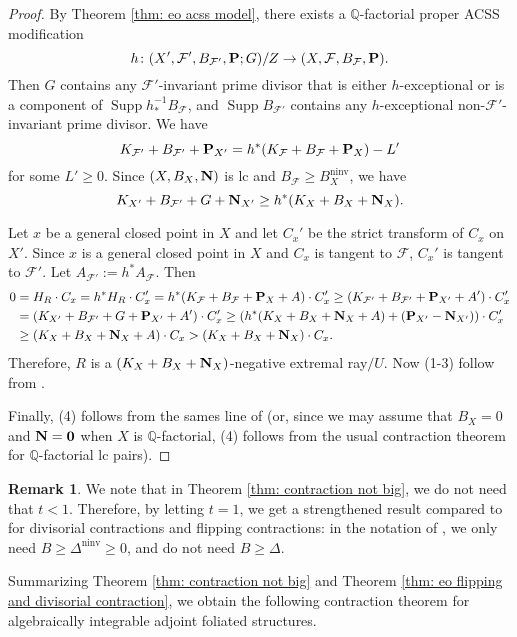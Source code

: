 \documentclass[12pt]{amsart}
\numberwithin{equation}{section}
\newcommand{\Nn}{{\bf{N}}}
\newcommand{\Pp}{{\bf{P}}}
\newcommand{\Qq}{\mathbb{Q}}
\newcommand{\ninv}{\operatorname{ninv}}
\newcommand{\Supp}{\operatorname{Supp}}
\newcommand{\Ff}{\mathcal{F}}
\theoremstyle{definition}
\theoremstyle{definition}
\newtheorem{rem}[thm]{Remark}
\theoremstyle{definition}
\begin{document}
\begin{proof}
By Theorem \ref{thm: eo acss model}, there exists a $\Qq$-factorial proper  ACSS modification $$h\colon (X',\Ff',B_{\Ff'},\Pp;G)/Z\rightarrow (X,\Ff,B_{\Ff},\Pp).$$ Then $G$ contains any $\Ff'$-invariant prime divisor that is either $h$-exceptional or is a component of $\Supp h_\ast ^{-1}B_{\Ff}$, and $\Supp B_{\Ff'}$ contains any $h$-exceptional non-$\Ff'$-invariant prime divisor. We have
$$K_{\Ff'}+B_{\Ff'}+\Pp_{X'}=h^\ast (K_{\Ff}+B_{\Ff}+\Pp_X)-L'$$
for some $L'\geq 0$. Since $(X,B_X,\Nn)$ is lc and $B_{\Ff}\geq B_X^{\ninv}$, we have
$$K_{X'}+B_{\Ff'}+G+\Nn_{X'}\geq h^\ast (K_X+B_X+\Nn_X).$$

Let $x$ be a general closed point in $X$ and let $C_x'$ be the strict transform of $C_x$ on $X'$.  Since $x$ is a general closed point in $X$ and $C_x$ is tangent to $\Ff$, $C_x'$ is tangent to $\Ff'$.  Let $A_{\Ff'}:=h^\ast A_{\Ff}$. Then
\begin{align*}
  0&=H_R\cdot C_x=h^\ast H_R\cdot C_x'=h^\ast (K_{\Ff}+B_{\Ff}+\Pp_X+A)\cdot C_x'\geq (K_{\Ff'}+B_{\Ff'}+\Pp_{X'}+A')\cdot C_x'\\
  &=(K_{X'}+B_{\Ff'}+G+\Pp_{X'}+A')\cdot C_x'\geq (h^\ast (K_X+B_X+\Nn_X+A)+(\Pp_{X'}-\Nn_{X'}))\cdot C_x'\\
  &\geq (K_X+B_X+\Nn_X+A)\cdot C_x>(K_X+B_X+\Nn_X)\cdot C_x.
\end{align*}
Therefore, $R$ is a $(K_X+B_X+\Nn_X)$-negative extremal ray$/U$. Now (1-3) follow from \cite[Theorems 2.2.1(4), 2.2.6]{CHLX23}. 

Finally, (4) follows from the sames line of \cite[Proof of Corollary 3.18]{KM98} (or, since we may assume that $B_X=0$ and $\Nn=\bm{0}$ when $X$ is $\Qq$-factorial, (4) follows from the usual contraction theorem for $\Qq$-factorial lc pairs).
\end{proof}

\begin{rem}
    We note that in Theorem \ref{thm: contraction not big}, we do not need that $t<1$. Therefore, by letting $t=1$, we get a strengthened result compared to \cite[Proposition 7.1]{LMX24b} for divisorial contractions and flipping contractions: in the notation of \cite[Proposition 7.1]{LMX24b}, we only need $B\geq\Delta^{\ninv}\geq 0$, and do not need $B\geq\Delta$.
\end{rem}

Summarizing Theorem \ref{thm: contraction not big} and Theorem \ref{thm: eo flipping and divisorial contraction}, we obtain the following contraction theorem for algebraically integrable adjoint foliated structures.
\end{document}
